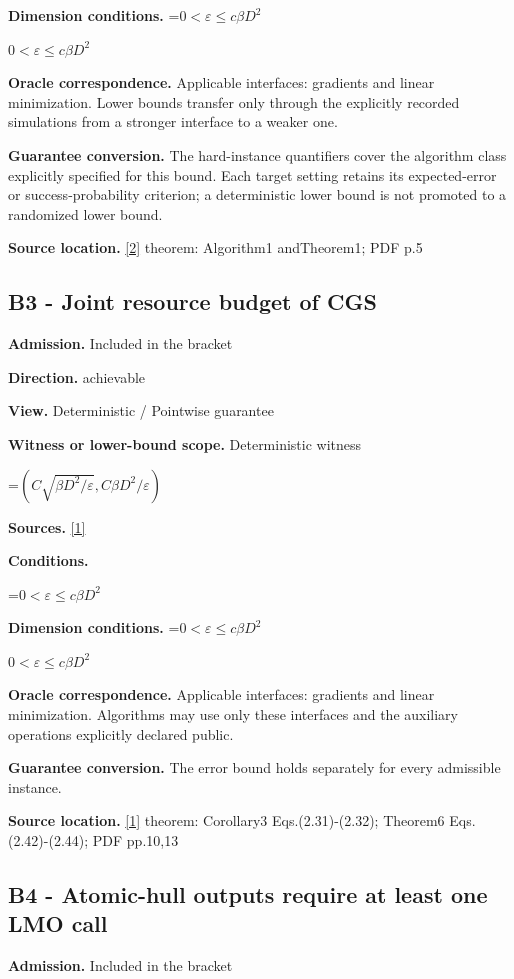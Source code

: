 \documentclass[10pt,a4paper]{article}
\newcommand{\AtlasMath}[1]{\par\begingroup\centering\setbox0=\hbox{$\displaystyle #1$}\ifdim\wd0>1.4\linewidth\typeout{ATLAS WIDE FORMULA: \the\wd0}\fi\ifdim\wd0>\linewidth\resizebox{\linewidth}{!}{\box0}\else\box0\fi\par\endgroup}
\newcommand{\AtlasInlineMath}[1]{\begingroup\setbox0=\hbox{$#1$}\ifdim\wd0>.4\linewidth\endgroup\AtlasMath{#1}\else\endgroup$#1$\fi}
\begin{document}
\textbf{Dimension conditions.} \AtlasInlineMath{0<\varepsilon\le c\beta D^2}

\textbf{Oracle correspondence.} Applicable interfaces: gradients and linear minimization. Lower bounds transfer only through the explicitly recorded simulations from a stronger interface to a weaker one.

\textbf{Guarantee conversion.} The hard-instance quantifiers cover the algorithm class explicitly specified for this bound. Each target setting retains its expected-error or success-probability criterion; a deterministic lower bound is not promoted to a randomized lower bound.

\textbf{Source location.} \href{https://arxiv.org/pdf/1309.5550}{[2]} theorem: Algorithm1 andTheorem1; PDF p.5

\subsection{B3 - Joint resource budget of CGS}
\textbf{Admission.} Included in the bracket

\textbf{Direction.} achievable

\textbf{View.} Deterministic / Pointwise guarantee

\textbf{Witness or lower-bound scope.} Deterministic witness

\AtlasMath{(C\sqrt{\beta D^2/\varepsilon},C\beta D^2/\varepsilon)}
\textbf{Sources.} \href{https://optimization-online.org/wp-content/uploads/2014/10/4605.pdf}{[1]}

\textbf{Conditions.} 
\AtlasMath{0<\varepsilon\le c\beta D^2}


\textbf{Dimension conditions.} \AtlasInlineMath{0<\varepsilon\le c\beta D^2}

\textbf{Oracle correspondence.} Applicable interfaces: gradients and linear minimization. Algorithms may use only these interfaces and the auxiliary operations explicitly declared public.

\textbf{Guarantee conversion.} The error bound holds separately for every admissible instance.

\textbf{Source location.} \href{https://optimization-online.org/wp-content/uploads/2014/10/4605.pdf}{[1]} theorem: Corollary3 Eqs.(2.31)-(2.32); Theorem6 Eqs.(2.42)-(2.44); PDF pp.10,13

\subsection{B4 - Atomic-hull outputs require at least one LMO call}
\textbf{Admission.} Included in the bracket
\end{document}
